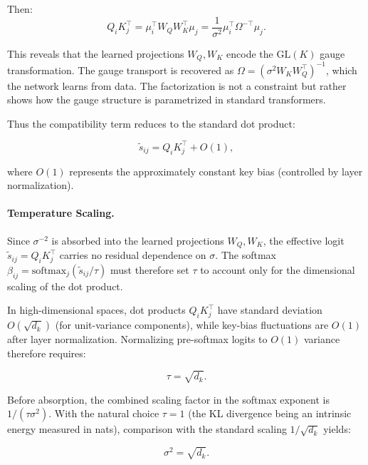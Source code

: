 \documentclass[twoside,11pt]{article}
\begin{document}
Then:
\begin{equation}
Q_i K_j^\top = \mu_i^\top W_Q W_K^\top \mu_j = \frac{1}{\sigma^2}\mu_i^\top \Omega^{-\top} \mu_j.
\end{equation}

This reveals that the learned projections $W_Q, W_K$ encode the $\mathrm{GL}(K)$ gauge transformation. The gauge transport is recovered as $\Omega = (\sigma^2 W_K W_Q^\top)^{-1}$, which the network learns from data. The factorization is not a constraint but rather shows how the gauge structure is parametrized in standard transformers.

Thus the compatibility term reduces to the standard dot product:

\begin{equation}
\tilde{s}_{ij} = Q_i K_j^\top + O(1),
\end{equation}

where $O(1)$ represents the approximately constant key bias (controlled by layer normalization).

\paragraph{Temperature Scaling.}

Since $\sigma^{-2}$ is absorbed into the learned projections $W_Q, W_K$, the effective logit $\tilde{s}_{ij} = Q_i K_j^\top$ carries no residual dependence on $\sigma$. The softmax $\beta_{ij} = \mathrm{softmax}_j(\tilde{s}_{ij}/\tau)$ must therefore set $\tau$ to account only for the dimensional scaling of the dot product.

In high-dimensional spaces, dot products $Q_iK_j^\top$ have standard deviation $O(\sqrt{d_k})$ (for unit-variance components), while key-bias fluctuations are $O(1)$ after layer normalization. Normalizing pre-softmax logits to $O(1)$ variance therefore requires:

\begin{equation}
\tau = \sqrt{d_k}.
\end{equation}

Before absorption, the combined scaling factor in the softmax exponent is $1/(\tau\sigma^2)$. With the natural choice $\tau = 1$ (the KL divergence being an intrinsic energy measured in nats), comparison with the standard scaling $1/\sqrt{d_k}$ yields:

\begin{equation}
\sigma^2 = \sqrt{d_k}.
\end{equation}
\end{document}
